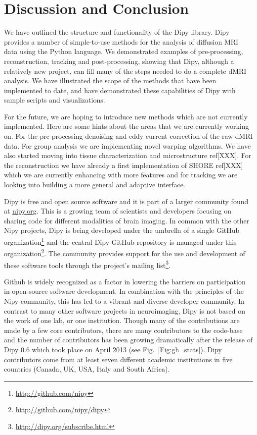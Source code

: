 \documentclass{bioinfo}
\begin{document}
\section{Discussion and Conclusion}

We have outlined the structure and functionality of the Dipy library.  Dipy
provides a number of simple-to-use methods for the analysis of diffusion MRI data using the Python
language. We demonstrated examples of pre-processing, reconstruction, tracking and post-processing,
showing that Dipy, although a relatively new project, can fill many of the steps needed to do a complete
dMRI analysis. We have illustrated the scope of the methods that have been implemented to date, and have
demonstrated these capabilities of Dipy with sample scripts and visualizations.

For the future, we are hoping to introduce new methods which are not currently implemented. Here are some hints about the areas that we are currently working on. For the pre-processing denoising and eddy-current correction of the raw dMRI data. For group analysis we are implementing novel warping algorithms. We have also started moving into tissue characterization and microstructure ref[XXX]. For the reconstruction we have already a first implementation of SHORE ref[XXX] which we are currently enhancing with more features and for tracking we are looking into building a more general and adaptive interface.

Dipy is free and open source software and it is part of a larger community found at \url{nipy.org}.
This is a growing team of scientists and developers focusing on sharing code for different modalities
of brain imaging. In common with the other Nipy projects, Dipy is being developed under the
umbrella of a single GitHub organization\footnote{\url{http://github.com/nipy}} and the central
Dipy GitHub repository is managed under this organization\footnote{\url{http://github.com/nipy/dipy}}.
The community provides support for the use and development of these software tools through
the project's mailing list\footnote{\url{http://dipy.org/subscribe.html}}.

Github is widely recognized as a factor in lowering the barriers on
participation in open-source software development. In combination with
the principles of the Nipy community, this has led to a vibrant and diverse
developer community. In contrast to many other software projects in
neuroimaging, Dipy is not based on the work of one lab, or one institution. Though
many of the contributions are made by a few core contributors, there are many
contributors to the code-base and the number of contributors has been growing
dramatically after the release of Dipy 0.6 which took place on April 2013 (see
Fig.~\ref{Fig:gh_stats}).
Dipy contributors come from at least seven different academic
institutions in five countries (Canada, UK, USA, Italy and South Africa).
\end{document}
